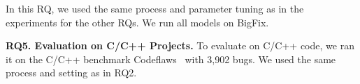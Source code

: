 

In this RQ, we used the same process and parameter tuning as in the
experiments for the other RQs. We run all models on BigFix.


{\bf RQ5. Evaluation on C/C++ Projects.}  To evaluate {\tool} on C/C++
code, we ran it on the C/C++ benchmark
Codeflaws~\cite{tan2017codeflaws} with 3,902 bugs. 
We used the same process and setting as in RQ2.
